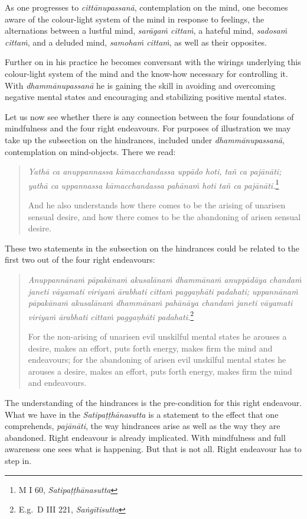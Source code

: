 As one progresses to \emph{cittānupassanā}, contemplation on the mind, one becomes aware of the colour-light system of the mind in response to feelings, the alternations between a lustful mind, \emph{sarāgaṁ cittaṁ}, a hateful mind, \emph{sadosaṁ cittaṁ}, and a deluded mind, \emph{samohaṁ cittaṁ}, as well as their opposites.

Further on in his practice he becomes conversant with the wirings underlying this colour-light system of the mind and the know-how necessary for controlling it. With \emph{dhammānupassanā} he is gaining the skill in avoiding and overcoming negative mental states and encouraging and stabilizing positive mental states.

Let us now see whether there is any connection between the four foundations of mindfulness and the four right endeavours. For purposes of illustration we may take up the subsection on the hindrances, included under \emph{dhammānupassanā}, contemplation on mind-objects. There we read:

\begin{quote}
\emph{Yathā ca anuppannassa kāmacchandassa uppādo hoti, tañ ca pajānāti; yathā ca uppannassa kāmacchandassa pahānaṁ hoti tañ ca pajānāti.}\footnote{M I 60, \emph{Satipaṭṭhānasutta}}

And he also understands how there comes to be the arising of unarisen sensual desire, and how there comes to be the abandoning of arisen sensual desire.
\end{quote}

These two statements in the subsection on the hindrances could be related to the first two out of the four right endeavours:

\begin{quote}
\emph{Anuppannānaṁ pāpakānaṁ akusalānaṁ dhammānaṁ anuppādāya chandaṁ janeti vāyamati viriyaṁ ārabhati cittaṁ paggaṇhāti padahati; uppannānaṁ pāpakānaṁ akusalānaṁ dhammānaṁ pahānāya chandaṁ janeti vāyamati viriyaṁ ārabhati cittaṁ paggaṇhāti padahati.}\footnote{E.g.~D III 221, \emph{Saṅgītisutta}}

For the non-arising of unarisen evil unskilful mental states he arouses a desire, makes an effort, puts forth energy, makes firm the mind and endeavours; for the abandoning of arisen evil unskilful mental states he arouses a desire, makes an effort, puts forth energy, makes firm the mind and endeavours.
\end{quote}

The understanding of the hindrances is the pre-condition for this right endeavour. What we have in the \emph{Satipaṭṭhānasutta} is a statement to the effect that one comprehends, \emph{pajānāti}, the way hindrances arise as well as the way they are abandoned. Right endeavour is already implicated. With mindfulness and full awareness one sees what is happening. But that is not all. Right endeavour has to step in.

